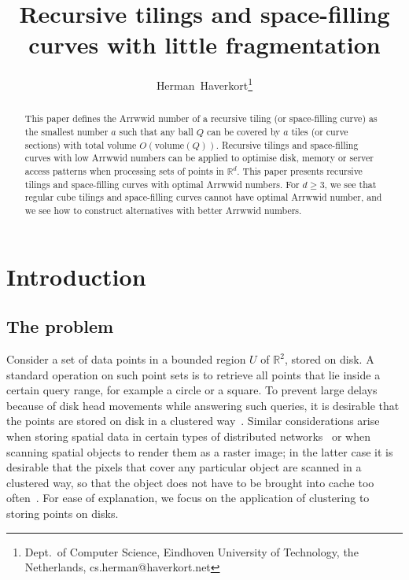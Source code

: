 \documentclass[11pt,a4paper]{article}
\newcommand{\vol}{\mathrm{volume}}
\newcommand{\Reals}{\mathbb{R}}
\newcommand{\unittile}{\ensuremath{U}\xspace}
\begin{document}
\title{Recursive tilings and space-filling curves with little fragmentation}

\author{Herman~Haverkort\thanks{Dept.\ of Computer Science, Eindhoven University of Technology, the Netherlands, cs.herman@haverkort.net}
}
\maketitle

\begin{abstract}
This paper defines the Arrwwid number of a recursive tiling (or space-filling curve) as the smallest number $a$ such that any ball $Q$ can be covered by $a$ tiles (or curve sections) with total volume $O(\vol(Q))$. Recursive tilings and space-filling curves with low Arrwwid numbers can be applied to optimise disk, memory or server access patterns when processing sets of points in $\Reals^d$. This paper presents recursive tilings and space-filling curves with optimal Arrwwid numbers. For $d \geq 3$, we see that regular cube tilings and space-filling curves cannot have optimal Arrwwid number, and we see how to construct alternatives with better Arrwwid numbers.
\end{abstract}

\section{Introduction}
\subsection{The problem}
Consider a set of data points in a bounded region \unittile of $\Reals^2$, stored on disk. A standard operation on such point sets is to retrieve all points that lie inside a certain query range, for example a circle or a square. To prevent large delays because of disk head movements while answering such queries, it is desirable that the points are stored on disk in a clustered way~\cite{Asano1997,Jagadish1990,Jagadish1997,Kumar1994,Moon2001}. Similar considerations arise when storing spatial data in certain types of distributed networks~\cite{Scholl2009} or when scanning spatial objects to render them as a raster image; in the latter case it is desirable that the pixels that cover any particular object are scanned in a clustered way, so that the object does not have to be brought into cache too often~\cite{Voorhies1991}. For ease of explanation, we focus on the application of clustering to storing points on disks.
\end{document}
